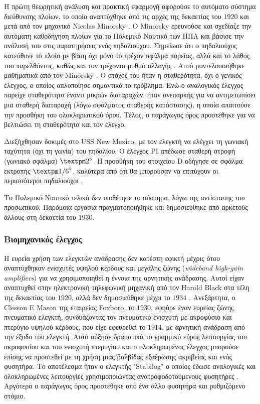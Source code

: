 Η πρώτη θεωρητική ανάλυση και πρακτική εφαρμογή αφορούσε το αυτόματο σύστημα διεύθυνσης πλοίων, το οποίο αναπτύχθηκε από τις αρχές της δεκαετίας του $1920$ και μετά από τον μηχανικό Nicolas Minorsky \cite{origin8}. Ο Minorsky ερευνούσε και σχεδίαζε την αυτόματη καθοδήγηση πλοίων για το Πολεμικό Ναυτικό των ΗΠΑ και βάσισε την ανάλυσή του στις παρατηρήσεις ενός πηδαλιούχου. Σημείωσε ότι ο πηδαλιούχος κατεύθυνε το πλοίο με βάση όχι μόνο το τρέχον σφάλμα πορείας, αλλά και το λάθος του παρελθόντος, καθώς και τον τρέχοντα ρυθμό αλλαγής \cite{origin9}. Αυτό μοντελοποιήθηκε μαθηματικά από τον Minorsky \cite{origin3}. Ο στόχος του ήταν η σταθερότητα, όχι ο γενικός έλεγχος, ο οποίος απλοποίησε σημαντικά το πρόβλημα. Ενώ ο αναλογικός έλεγχος παρείχε σταθερότητα έναντι μικρών διαταραχών, ήταν ανεπαρκής για να αντιμετωπίσει μια σταθερή διαταραχή (λόγω σφάλματος σταθερής κατάστασης), η οποία απαιτούσε την προσθήκη του ολοκληρωτικού όρου. Τέλος, ο παράγωγος όρος προστέθηκε για να βελτιώσει τη σταθερότητα και τον έλεγχο.

Διεξήχθησαν δοκιμές στο USS New Mexico, με τον ελεγκτή να ελέγχει τη γωνιακή ταχύτητα (όχι τη γωνία) του πηδαλίου. Ο έλεγχος PI απέδωσε σταθερή στροφή (γωνιακό σφάλμα) $±2\degree$. Η προσθήκη του στοιχείου D οδήγησε σε σφάλμα εκτροπής $±{1/6}\degree$, καλύτερα από ότι θα μπορούσαν να επιτύχουν οι περισσότεροι πηδαλιούχοι \cite{origin10}.

Το Πολεμικό Ναυτικό τελικά δεν υιοθέτησε το σύστημα, λόγω της αντίστασης του προσωπικού. Παρόμοια εργασία πραγματοποιήθηκε και δημοσιεύθηκε από αρκετούς άλλους στη δεκαετία του $1930$.

\subsubsection{Βιομηχανικός έλεγχος}
Η ευρεία χρήση των ελεγκτών ανάδρασης δεν κατέστη εφικτή μέχρις ότου αναπτύχθηκαν ενισχυτές υψηλού κέρδους και μεγάλης ζώνης (\emph{wideband high-gain amplifiers}) για να χρησιμοποιηθεί η έννοια της αρνητικής ανάδρασης. Αυτοί είχαν αναπτυχθεί στην ηλεκτρονική τηλεφωνική μηχανική από τον Harold Black στα τέλη της δεκαετίας του $1920$, αλλά δεν δημοσιεύθηκε μέχρι το $1934$ \cite{origin3}. Ανεξάρτητα, ο Clesson E Mason της εταιρείας Foxboro, το $1930$, εφηύρε έναν ευρείας ζώνης πνευματικό ελεγκτή, συνδυάζοντας τον πνευματικό ενισχυτή με ακροφύσιο και πτερύγιο υψηλού κέρδους, που είχε εφευρεθεί το $1914$, με αρνητική ανάδραση από την έξοδο του ελεγκτή. Αυτό αύξησε δραματικά το γραμμικό εύρος λειτουργίας του ακροφυσίου και του ενισχυτή πτερυγίου και ο ολοκληρωμένος έλεγχος μπορούσε επίσης να προστεθεί με τη χρήση μιας βαλβίδας εξαέρωσης ακριβείας και ενός φυσητήρα. Το αποτέλεσμα ήταν ο ελεγκτής "Stabilog" ο οποίος έδωσε αναλογικές και ολοκληρωμένες λειτουργίες χρησιμοποιώντας ανατροφοδοτούμενους φυσητήρες \cite{origin3}. Αργότερα ο παράγωγος όρος προστέθηκε από ένα άλλο φυσητήρα και ρυθμιζόμενο στόμιο.

